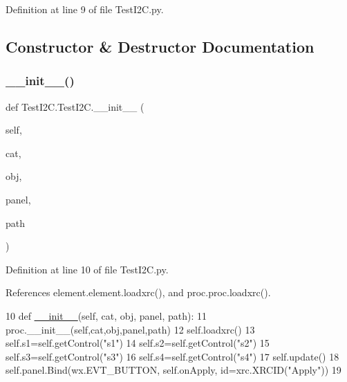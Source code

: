 Definition at line 9 of file Test\+I2\+C.\+py.



\subsection{Constructor \& Destructor Documentation}
\mbox{\label{classTestI2C_1_1TestI2C_ab3283d2bcd0fe2782094a799ef259334}} 
\subsubsection{\texorpdfstring{\+\_\+\+\_\+init\+\_\+\+\_\+()}{\_\_init\_\_()}}
{\footnotesize\ttfamily def Test\+I2\+C.\+Test\+I2\+C.\+\_\+\+\_\+init\+\_\+\+\_\+ (\begin{DoxyParamCaption}\item[{}]{self,  }\item[{}]{cat,  }\item[{}]{obj,  }\item[{}]{panel,  }\item[{}]{path }\end{DoxyParamCaption})}



Definition at line 10 of file Test\+I2\+C.\+py.



References element.\+element.\+loadxrc(), and proc.\+proc.\+loadxrc().


\begin{DoxyCode}
10     \textcolor{keyword}{def }\hyperlink{classwrapper_1_1ModuleDictWrapper_a9a7a794150502f51df687831583e13b9}{\_\_init\_\_}(self, cat, obj, panel, path):
11         proc.\_\_init\_\_(self,cat,obj,panel,path)
12         self.loadxrc()
13         self.s1=self.getControl(\textcolor{stringliteral}{"s1"})
14         self.s2=self.getControl(\textcolor{stringliteral}{"s2"})
15         self.s3=self.getControl(\textcolor{stringliteral}{"s3"})
16         self.s4=self.getControl(\textcolor{stringliteral}{"s4"})
17         self.update()
18         self.panel.Bind(wx.EVT\_BUTTON, self.onApply, id=xrc.XRCID(\textcolor{stringliteral}{"Apply"}))
19 
\end{DoxyCode}


